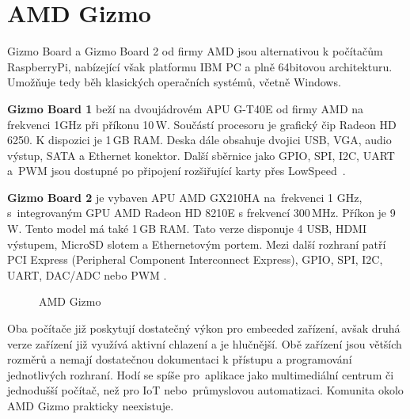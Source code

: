  \section{AMD Gizmo}
\label{KapAMD}

	Gizmo Board a Gizmo Board 2 od firmy AMD jsou alternativou k počítačům RaspberryPi, nabízející však platformu IBM PC a plně 64bitovou architekturu. Umožňuje tedy běh klasických operačních systémů, včetně Windows.
	
		\textbf{Gizmo Board 1} beží na dvoujádrovém APU G-T40E od firmy AMD na frekvenci 1GHz při příkonu 10\,W. Součástí procesoru je grafický čip Radeon HD 6250. K dispozici je 1\,GB RAM. Deska dále obsahuje dvojici USB, VGA, audio výstup, SATA a Ethernet konektor. Další sběrnice jako GPIO, SPI, I2C, UART a~PWM jsou dostupné po připojení rozšiřující karty přes LowSpeed~\cite{AmdGizmo1}.
	
	\textbf{ Gizmo Board 2} je vybaven APU AMD GX210HA na~frekvenci 1 GHz, s~integrovaným GPU AMD Radeon HD 8210E s frekvencí 300\,MHz. Příkon je 9\,W. Tento model má také 1\,GB RAM. Tato verze disponuje 4 USB, HDMI výstupem, MicroSD slotem a Ethernetovým portem. Mezi další rozhraní patří PCI Express (Peripheral Component Interconnect Express), GPIO, SPI, I2C, UART, DAC/ADC nebo PWM \cite{AmdGizmo2}.


\begin{figure}[!ht]
    \centering
			\hspace*{5mm}
		\caption{AMD Gizmo}
\end{figure}



	
Oba počítače již poskytují dostatečný výkon pro embeeded zařízení, avšak druhá verze zařízení již využívá aktivní chlazení a je hlučnější. Obě zařízení jsou větších rozměrů a nemají dostatečnou dokumentaci k přístupu a programování jednotlivých rozhraní. Hodí se spíše pro~aplikace jako multimediální centrum či jednodušší počítač, než pro IoT nebo~průmyslovou automatizaci. Komunita okolo AMD Gizmo prakticky neexistuje.
	
	



